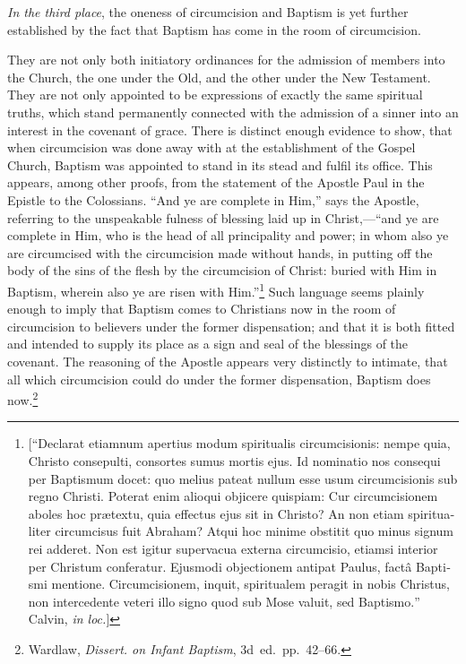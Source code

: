 \documentclass[
]{book}
\begin{document}
\emph{In the third place}, the oneness of circumcision and Baptism is yet further established by the fact that Baptism has come in the room of circumcision.

They are not only both initiatory ordinances for the admission of members into the Church, the one under the Old, and the other under the New Testament. They are not only appointed to be expressions of exactly the same spiritual truths, which stand permanently connected with the admission of a sinner into an interest in the covenant of grace. There is distinct enough evidence to show, that when circumcision was done away with at the establishment of the Gospel Church, Baptism was appointed to stand in its stead and fulfil its office. This appears, among other proofs, from the statement of the Apostle Paul in the Epistle to the Colossians. ``And ye are complete in Him,'' says the Apostle, referring to the unspeakable fulness of blessing laid up in Christ,---``and ye are complete in Him, who is the head of all principality and power; in whom also ye are circumcised with the circumcision made without hands, in putting off the body of the sins of the flesh by the circumcision of Christ: buried with Him in Baptism, wherein also ye are risen with Him.''\footnote{{[}``\foreignlanguage{latin}{Declarat etiamnum apertius modum spiritualis circumcisionis: nempe quia, Christo consepulti, consortes sumus mortis ejus. Id nominatio nos consequi per Baptismum docet: quo melius pateat nullum esse usum circumcisionis sub regno Christi. Poterat enim alioqui objicere quispiam: Cur circumcisionem aboles hoc prætextu, quia effectus ejus sit in Christo? An non etiam spiritualiter circumcisus fuit Abraham? Atqui hoc minime obstitit quo minus signum rei adderet. Non est igitur supervacua externa circumcisio, etiamsi interior per Christum conferatur. Ejusmodi objectionem antipat Paulus, factâ Baptismi mentione. Circumcisionem, inquit, spiritualem peragit in nobis Christus, non intercedente veteri illo signo quod sub Mose valuit, sed Baptismo.}'' Calvin, \emph{in loc.}{]}} Such language seems plainly enough to imply that Baptism comes to Christians now in the room of circumcision to believers under the former dispensation; and that it is both fitted and intended to supply its place as a sign and seal of the blessings of the covenant. The reasoning of the Apostle appears very distinctly to intimate, that all which circumcision could do under the former dispensation, Baptism does now.\footnote{Wardlaw, \emph{Dissert. on Infant Baptism}, 3d~ed.~pp.~42--66.}
\end{document}
